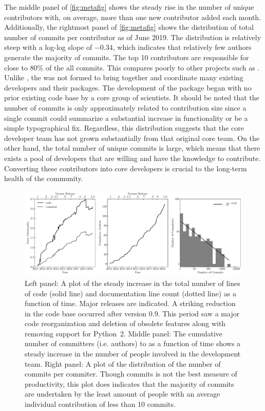 The middle panel of \autoref{fig:metafig} shows the steady rise in the number of unique contributors with, on average, more than one new contributor added each month.
Additionally, the rightmost panel of \autoref{fig:metafig} shows the distribution of total number of commits per contributor as of June 2019.
The distribution is relatively steep with a log-log slope of $-0.34$, which indicates that relatively few authors generate the majority of commits.
The top 10 contributors are responsible for close to 80\% of the all commits.
This compares poorly to other projects such as \astropy \citep{astropy2018}.
Unlike \astropy, the \sunpyproj was not formed to bring together and coordinate many existing developers and their \python packages.
The development of the \sunpypkg package began with no prior existing code base by a core group of scientists.
It should be noted that the number of commits is only approximately related to contribution size since a single commit could summarize a substantial increase in functionality or be a simple typographical fix.
Regardless, this distribution suggests that the core developer team has not grown substantially from that original core team.
On the other hand, the total number of unique commits is large, which means that there exists a pool of \sunpypkg developers that are willing and have the knowledge to contribute.
Converting these contributors into core developers is crucial to the long-term health of the community.


\begin{figure}
    \center
    \includegraphics[width = 1.0\textwidth]{figures/dev_meta.pdf}
    \caption{Left panel: A plot of the steady increase in the total number of lines of code (solid line) and documentation line count (dotted line) as a function of time.
	Major releases are indicated.
	A striking reduction in the code base occurred after version 0.9.
	This period saw a major code reorganization and deletion of obsolete features along with removing support for Python~2.
	Middle panel: The cumulative number of committers (i.e. authors) to \sunpypkg as a function of time shows a steady increase in the number of people involved in the development team.
	Right panel: A plot of the distribution of the number of commits per commiter.
	Though commits is not the best measure of productivity, this plot does indicates that the majority of commits are undertaken by the least amount of people with an average individual contribution of less than 10 commits.}
\label{fig:metafig}
\end{figure}
